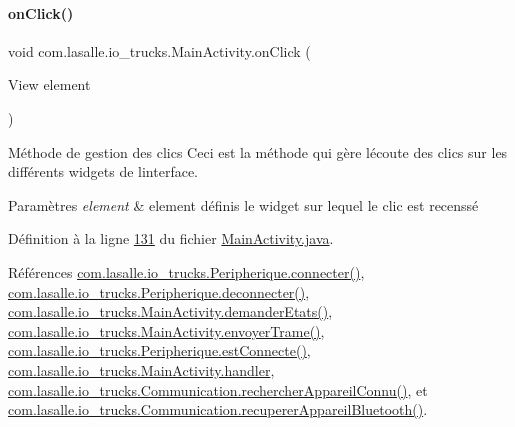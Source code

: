 \paragraph{\texorpdfstring{on\+Click()}{onClick()}}
{\footnotesize\ttfamily void com.\+lasalle.\+io\+\_\+trucks.\+Main\+Activity.\+on\+Click (\begin{DoxyParamCaption}\item[{View}]{element }\end{DoxyParamCaption})}



Méthode de gestion des clics Ceci est la méthode qui gère l\textquotesingle{}écoute des clics sur les différents widgets de l\textquotesingle{}interface. 


\begin{DoxyParams}{Paramètres}
{\em element} & element définis le widget sur lequel le clic est recenssé \\
\hline
\end{DoxyParams}


Définition à la ligne \hyperlink{_main_activity_8java_source_l00131}{131} du fichier \hyperlink{_main_activity_8java_source}{Main\+Activity.\+java}.



Références \hyperlink{_peripherique_8java_source_l00183}{com.\+lasalle.\+io\+\_\+trucks.\+Peripherique.\+connecter()}, \hyperlink{_peripherique_8java_source_l00235}{com.\+lasalle.\+io\+\_\+trucks.\+Peripherique.\+deconnecter()}, \hyperlink{_main_activity_8java_source_l00438}{com.\+lasalle.\+io\+\_\+trucks.\+Main\+Activity.\+demander\+Etats()}, \hyperlink{_main_activity_8java_source_l00242}{com.\+lasalle.\+io\+\_\+trucks.\+Main\+Activity.\+envoyer\+Trame()}, \hyperlink{_peripherique_8java_source_l00122}{com.\+lasalle.\+io\+\_\+trucks.\+Peripherique.\+est\+Connecte()}, \hyperlink{_main_activity_8java_source_l00403}{com.\+lasalle.\+io\+\_\+trucks.\+Main\+Activity.\+handler}, \hyperlink{_communication_8java_source_l00109}{com.\+lasalle.\+io\+\_\+trucks.\+Communication.\+rechercher\+Appareil\+Connu()}, et \hyperlink{_communication_8java_source_l00123}{com.\+lasalle.\+io\+\_\+trucks.\+Communication.\+recuperer\+Appareil\+Bluetooth()}.


